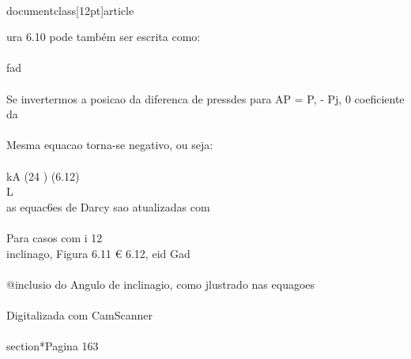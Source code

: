 \\documentclass[12pt]{article}
\begin{document}
ura 6.10 pode também ser escrita como:\\
\\
fad\\
\\
Se invertermos a posicao da diferenca de pressdes para AP = P, - Pj, 0 coeficiente da\\
\\
Mesma equacao torna-se negativo, ou seja:\\
\\
kA (24 ) (6.12)\\
L\\
as equac6es de Darcy sao atualizadas com\\
\\
Para casos com i 12\\
inclinago, Figura 6.11 € 6.12, eid Gad\\
\\
@inclusio do Angulo de inclinagio, como jlustrado nas equagoes\\
\\
Digitalizada com CamScanner\\

\\section*{Pagina 163}
\end{document}
